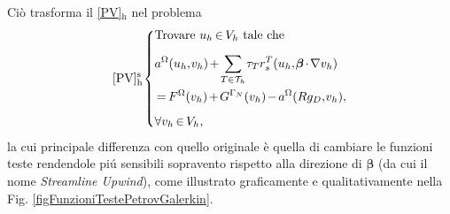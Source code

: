 \documentclass{article}
\newcommand{\SpaziaturaMate}[3]{
    \setlength{\thinmuskip}{#1mu}
    \setlength{\medmuskip}{#2mu}
    \setlength{\thickmuskip}{#3mu}
}
\newcommand{\teqref}[2]{\hyperref[#1]{#2}}
\begin{document}
                Ciò trasforma il \teqref{eqPSVariazionaleDiscreto}{[PV]$_\text{h}$} nel problema
                \begin{equation*}
                    \SpaziaturaMate{1}{2}{3}
                    [\text{PV}]^\text{s}_\text{h}
                    \left\{
                    \begin{aligned}
                        &\text{Trovare }u_h\in V_h\text{ tale che}\\[5pt]
                        &a^\Omega(u_h,v_h)+\sum_{T\in\mathcal T_h}\tau_Tr^T_s(u_h,\boldsymbol\beta\cdot\nabla v_h)\\
                        &=F^\Omega(v_h)+G^{\Gamma_N}(v_h)-a^\Omega(Rg_D,v_h),\\[5pt]
                        &\forall v_h\in V_h,
                    \end{aligned}
                    \right.
                    \label{eqPVDiscretoStabilizzato}
                \end{equation*}
                la cui principale differenza con quello originale è quella di cambiare le funzioni teste rendendole piú sensibili sopravento rispetto alla direzione di $\boldsymbol\beta$ (da cui il nome \textit{Streamline Upwind}), come illustrato graficamente e qualitativamente nella Fig. \ref{figFunzioniTestePetrovGalerkin}.
                
\end{document}
